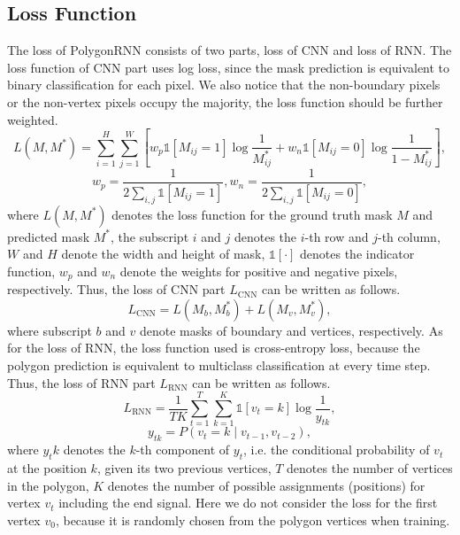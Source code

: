 \subsection{Loss Function}\label{losspoly}
The loss of PolygonRNN consists of two parts, loss of CNN and loss of RNN. The loss function of CNN part uses log loss, since the mask prediction is equivalent to binary classification for each pixel. We also notice that the non-boundary pixels or the non-vertex pixels occupy the majority, the loss function should be further weighted.
\begin{equation}
	L(M, M^*) = \sum_{i=1}^H\sum_{j=1}^W \left[w_p\mathbb{1}[M_{ij} = 1]\log{\frac{1}{M^*_{ij}}} + w_n\mathbb{1}[M_{ij} = 0]\log{\frac{1}{1-M^*_{ij}}} \right],
\end{equation}
\begin{equation}
	w_p = \frac{1}{2\sum_{i, j}\mathbb{1}[M_{ij} = 1]}, w_n = \frac{1}{2\sum_{i, j}\mathbb{1}[M_{ij} = 0]},
\end{equation}
where $L(M, M^*)$ denotes the loss function for the ground truth mask $M$ and predicted mask $M^*$, the subscript $i$ and $j$ denotes the $i$-th row and $j$-th column, $W$ and $H$ denote the width and height of mask, $\mathbb{1}[\cdot]$ denotes the indicator function, $w_p$ and $w_n$ denote the weights for positive and negative pixels, respectively. Thus, the loss of CNN part $L_{\text{CNN}}$ can be written as follows.
\begin{equation}
	L_{\text{CNN}} = L(M_b, M^*_b) + L(M_v, M^*_v),
\end{equation}
where subscript $b$ and $v$ denote masks of boundary and vertices, respectively. As for the loss of RNN, the loss function used is cross-entropy loss, because the polygon prediction is equivalent to multiclass classification at every time step. Thus, the loss of RNN part $L_{\text{RNN}}$ can be written as follows.
\begin{equation}
	L_{\text{RNN}} = \frac{1}{TK} \sum_{t=1}^T\sum_{k=1}^K\mathbb{1}[v_{t} = k]\log{\frac{1}{y_{tk}}},
\end{equation}
\begin{equation}
	y_{tk} = P(v_t = k \mid v_{t-1}, v_{t-2}),
\end{equation}
where $y_tk$ denotes the $k$-th component of $y_t$, i.e. the conditional probability of $v_t$ at the position $k$, given its two previous vertices, $T$ denotes the number of vertices in the polygon, $K$ denotes the number of possible assignments (positions) for vertex $v_t$ including the end signal. Here we do not consider the loss for the first vertex $v_0$, because it is randomly chosen from the polygon vertices when training.


